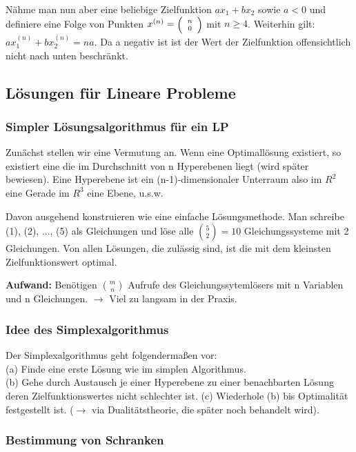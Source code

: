 Nähme man nun aber eine beliebige Zielfunktion $a x_{1}+b x_{2}$ sowie $a < 0$ 
und definiere eine Folge von Punkten $x^{(n)}= \mbox{\scriptsize$\left(
\begin{array}{c}n\\ 0\end{array}\right)$}$ mit $n \geq 4$. Weiterhin gilt: 
$a x_{1}^{(n)} + b x_{2}^{(n)} =  n a$. Da a negativ 
ist ist der Wert der Zielfunktion offensichtlich nicht nach unten
beschränkt.

\subsection{Lösungen für Lineare Probleme}

\subsubsection{Simpler Lösungsalgorithmus für ein LP}  

Zunächst stellen wir eine Vermutung an. Wenn eine Optimallösung
existiert, so existiert eine die im Durchschnitt von n Hyperebenen liegt
(wird später bewiesen). Eine Hyperebene ist ein (n-1)-dimensionaler
Unterraum also im $R^{2}$ eine Gerade im $R^{3}$ eine Ebene, u.s.w.

Davon ausgehend konstruieren wie eine einfache Lösungsmethode. Man
schreibe (1), (2), ..., (5) als Gleichungen und löse alle ${5\choose 2}
= 10$ Gleichungssysteme mit 2 Gleichungen. Von allen Lösungen, die
zulässig sind, ist die mit dem kleinsten Zielfunktionswert optimal.

{\bf Aufwand:} Benötigen ${m\choose n}$ Aufrufe des Gleichungssytemlösers mit
n Variablen und n Gleichungen. $\rightarrow$ Viel zu langsam in der
Praxis.

\subsubsection{Idee des Simplexalgorithmus}

Der Simplexalgorithmus geht folgendermaßen vor:\\
(a) Finde eine erste Lösung wie im simplen Algorithmus.\\
(b) Gehe durch Austausch je einer Hyperebene zu einer benachbarten
Lösung deren Zielfunktionswertes nicht schlechter ist.
(c) Wiederhole (b) bis Optimalität festgestellt ist. ($\rightarrow$ via
Dualitätstheorie, die später noch behandelt wird).

\subsubsection{Bestimmung von Schranken}


